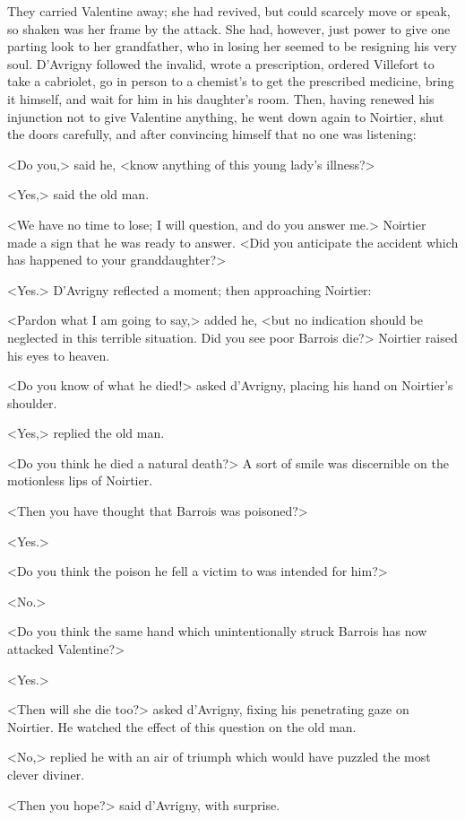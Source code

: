  They carried Valentine away; she had revived, but could scarcely move or speak, so shaken was her frame by the attack. She had, however, just power to give one parting look to her grandfather, who in losing her seemed to be resigning his very soul. D'Avrigny followed the invalid, wrote a prescription, ordered Villefort to take a cabriolet, go in person to a chemist's to get the prescribed medicine, bring it himself, and wait for him in his daughter's room. Then, having renewed his injunction not to give Valentine anything, he went down again to Noirtier, shut the doors carefully, and after convincing himself that no one was listening: 

 <Do you,> said he, <know anything of this young lady's illness?> 

 <Yes,> said the old man. 

 <We have no time to lose; I will question, and do you answer me.> Noirtier made a sign that he was ready to answer. <Did you anticipate the accident which has happened to your granddaughter?> 

 <Yes.> D'Avrigny reflected a moment; then approaching Noirtier: 

 <Pardon what I am going to say,> added he, <but no indication should be neglected in this terrible situation. Did you see poor Barrois die?> Noirtier raised his eyes to heaven. 

 <Do you know of what he died!> asked d'Avrigny, placing his hand on Noirtier's shoulder. 

 <Yes,> replied the old man. 

 <Do you think he died a natural death?> A sort of smile was discernible on the motionless lips of Noirtier. 

 <Then you have thought that Barrois was poisoned?> 

 <Yes.> 

 <Do you think the poison he fell a victim to was intended for him?> 

 <No.> 

 <Do you think the same hand which unintentionally struck Barrois has now attacked Valentine?> 

 <Yes.> 

 <Then will she die too?> asked d'Avrigny, fixing his penetrating gaze on Noirtier. He watched the effect of this question on the old man. 

 <No,> replied he with an air of triumph which would have puzzled the most clever diviner. 

 <Then you hope?> said d'Avrigny, with surprise. 

